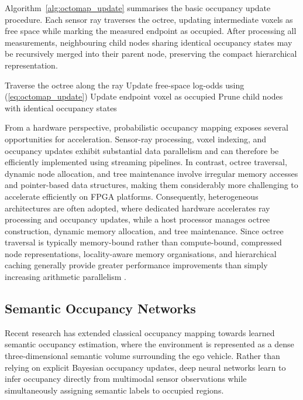 \documentclass[graybox,envcountchap]{style/SNmono}
\begin{document}
Algorithm~\ref{alg:octomap_update} summarises the basic occupancy update procedure. Each sensor ray traverses the octree, updating intermediate voxels as free space while marking the measured endpoint as occupied. After processing all measurements, neighbouring child nodes sharing identical occupancy states may be recursively merged into their parent node, preserving the compact hierarchical representation.

\begin{algorithm}[t]
\caption{Incremental Probabilistic OctoMap Update}
\label{alg:octomap_update}
\begin{algorithmic}[1]
    \State Traverse the octree along the ray
        \State Update free-space log-odds using (\ref{eq:octomap_update})
    \EndFor
    \State Update endpoint voxel as occupied
\EndFor
\State Prune child nodes with identical occupancy states
\end{algorithmic}
\end{algorithm}

From a hardware perspective, probabilistic occupancy mapping exposes several opportunities for acceleration. Sensor-ray processing, voxel indexing, and occupancy updates exhibit substantial data parallelism and can therefore be efficiently implemented using streaming pipelines. In contrast, octree traversal, dynamic node allocation, and tree maintenance involve irregular memory accesses and pointer-based data structures, making them considerably more challenging to accelerate efficiently on FPGA platforms. Consequently, heterogeneous architectures are often adopted, where dedicated hardware accelerates ray processing and occupancy updates, while a host processor manages octree construction, dynamic memory allocation, and tree maintenance. Since octree traversal is typically memory-bound rather than compute-bound, compressed node representations, locality-aware memory organisations, and hierarchical caching generally provide greater performance improvements than simply increasing arithmetic parallelism \cite{jia2022_omu}.

\subsection{Semantic Occupancy Networks}

Recent research has extended classical occupancy mapping towards learned semantic occupancy estimation, where the environment is represented as a dense three-dimensional semantic volume surrounding the ego vehicle. Rather than relying on explicit Bayesian occupancy updates, deep neural networks learn to infer occupancy directly from multimodal sensor observations while simultaneously assigning semantic labels to occupied regions.
\end{document}
